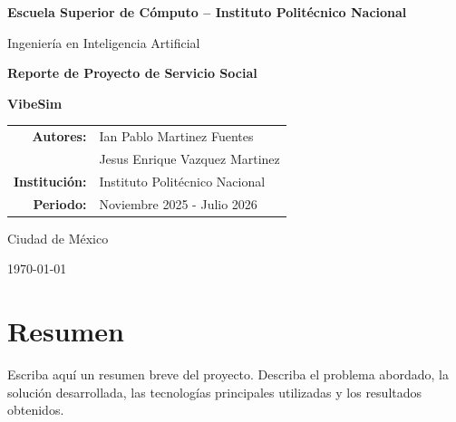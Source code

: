 \documentclass[12pt,a4paper]{article}
\newcommand{\NombreProyecto}{VibeSim}
\newcommand{\Institucion}{Instituto Politécnico Nacional}
\newcommand{\Periodo}{Noviembre 2025 - Julio 2026}
\newcommand{\Carrera}{Ingeniería en Inteligencia Artificial}
\newcommand{\InstitucionEducativa}{Escuela Superior de Cómputo -- Instituto Politécnico Nacional}
\begin{document}
\begin{titlepage}
    \centering

    \vspace*{1.5cm}

    {\Large \textbf{\InstitucionEducativa}\par}

    \vspace{1.5cm}

    {\large \Carrera\par}

    \vspace{2.5cm}

    {\LARGE \textbf{Reporte de Proyecto de Servicio Social}\par}

    \vspace{1cm}

    {\Large \textbf{\NombreProyecto}\par}

    \vspace{2.5cm}

    \begin{tabular}{rl}
        \textbf{Autores:} & Ian Pablo Martinez Fuentes \\
                          & Jesus Enrique Vazquez Martinez \\[0.5cm]
        \textbf{Institución:} & \Institucion \\
        \textbf{Periodo:} & \Periodo
    \end{tabular}

    \vfill

    {\large Ciudad de México\par}
    {\large \today\par}

\end{titlepage}

\section*{Resumen}

Escriba aquí un resumen breve del proyecto. Describa el problema abordado,
la solución desarrollada, las tecnologías principales utilizadas y los
resultados obtenidos.

\tableofcontents
\newpage

\end{document}
